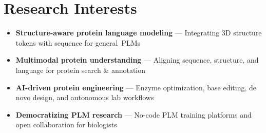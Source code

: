 \documentclass[10pt]{article}
\begin{document}
\section*{Research Interests}
\begin{itemize}
    \item \textbf{Structure-aware protein language modeling} --- Integrating 3D structure tokens with sequence for general~PLMs
    \item \textbf{Multimodal protein understanding} --- Aligning sequence, structure, and language for protein search \& annotation
    \item \textbf{AI-driven protein engineering} --- Enzyme optimization, base editing, de novo design, and autonomous lab workflows
    \item \textbf{Democratizing PLM research} --- No-code PLM training platforms and open collaboration for biologists
\end{itemize}
\end{document}
